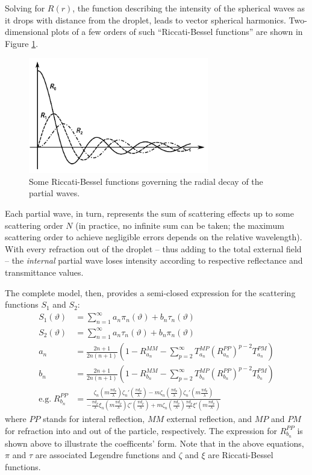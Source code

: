 \documentclass[11.5pt]{book}
\begin{document}
Solving for $R(r)$, the function describing the intensity of the spherical waves
as it drops with distance from the droplet, leads to vector spherical harmonics.
Two-dimensional plots of a few orders of such ``Riccati-Bessel functions'' are
shown in Figure \ref{fig:besselfuncs}.

\begin{figure}
    \centering
    \includegraphics[width=0.7\textwidth]{img/scattering/bessel.pdf}
    \caption{Some Riccati-Bessel functions governing the radial decay of the partial
    waves.}
    \label{fig:besselfuncs}
\end{figure}

Each partial wave, in turn, represents the sum of scattering effects up to some
scattering order $N$ (in practice, no infinite sum can be taken; the maximum
scattering order to achieve negligible errors depends on the relative
wavelength). With every refraction out of the droplet -- thus adding to the
total external field -- the \emph{internal} partial wave loses intensity
according to respective reflectance and transmittance values.


The complete model, then, provides a semi-closed expression for the scattering
functions $S_1$ and $S_2$:
   \begin{align}
      S_1(\vartheta) &= \sum_{n=1}^{\infty} a_n\pi_n(\vartheta) +
      b_n\tau_n(\vartheta) \\
      S_2(\vartheta) &= \sum_{n=1}^{\infty} a_n\tau_n(\vartheta) +
      b_n\pi_n(\vartheta) \\
      a_n &= \frac{2n+1}{2n(n+1)} (1-R^{MM}_{a_n} - \sum_{p=2}^{\infty}
      T_{a_n}^{MP} (R_{a_n}^{PP})^{p-2} T_{a_n}^{PM}) \\
      b_n &= \frac{2n+1}{2n(n+1)} (1-R^{MM}_{b_n} - \sum_{p=2}^{\infty}
      T_{b_n}^{MP} (R_{b_n}^{PP})^{p-2} T_{b_n}^{PM}) \\
      \mathrm{e.g.\;} R_{b_n}^{PP} &= \frac{\zeta_n(m \frac{\pi
      d_p}{\lambda})\zeta_n'(\frac{\pi d_p}{\lambda}) -
      m\zeta_n(\frac{\pi d_p}{\lambda})\zeta_n'(m \frac{\pi
      d_p}{\lambda})}{-\frac{\pi d_p}{\lambda}\xi_n(m \frac{\pi
      d_p}{\lambda})\zeta'(\frac{\pi d_p}{\lambda}) + m\zeta_n(\frac{\pi
      d_p}{\lambda})\frac{\pi d_p}{\lambda}\xi'(m \frac{\pi
      d_p}{\lambda})}
    \end{align}
where $PP$ stands for interal reflection, $MM$ external reflection, and $MP$
and $PM$ for refraction into and out of the particle, respectively. The
expression for $R_{b_n}^{PP}$ is shown above to illustrate the coefficents'
form. Note that in the above equations, $\pi$ and $\tau$ are associated Legendre functions and $\zeta$ and $\xi$ are Riccati-Bessel functions.
\end{document}
